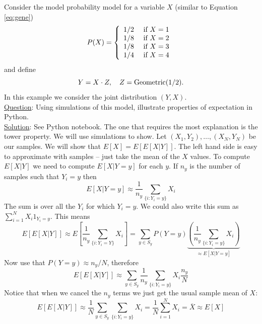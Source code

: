   
   \begin{example}
Consider the model probability model for a variable $X$ (similar to Equation \ref{eq:gene}) 
\begin{equation*}\label{eq:gene}
P(X) = \left\{ \begin{array}{cc}
1/2 & \text{ if }X=1\\
1/8 & \text{ if }X=2\\
1/8 & \text{ if }X=3\\
1/4 & \text{ if }X=4
\end{array}
 \right.\\
 \end{equation*}
 and define 
 \begin{equation*}
 Y = X\cdot Z,\quad Z = {\rm Geometric}(1/2). 
 \end{equation*}
In this example we consider the joint distribution $(Y,X)$. \\


\noindent
\underline{Question}: Using simulations of this model, illustrate properties of expectation in Python.\\

\noindent
\underline{Solution}: See Python notebook. The one that requires the most explanation is the tower property.
We will use simulations to show. Let $(X_1,Y_2),\dots,(X_N,Y_N)$ be our samples. We will show that $E[X] = E[E[X|Y]]$. The left hand side is easy to approximate with samples -- just take the mean of the $X$ values. To compute $E[X|Y]$ we need to compute $E[X|Y=y]$ for each $y$. If $n_y$ is the number of samples such that $Y_i=y$ then 
\begin{equation*}
E[X|Y=y] \approx \frac{1}{n_y}\sum_{\{i:Y_i =y\}}X_i
\end{equation*}
The sum is over all the $Y_i$ for which $Y_i=y$. We could also write this sum as $\sum_{i=1}^NX_i1_{Y_i=y}$. 
This means 
\begin{equation*}
E[E[X|Y]] \approx E\left[ \frac{1}{n_y}\sum_{\{i:Y_i =Y\}}X_i  \right] = \sum_{y \in S_y}P(Y=y)\underbrace{\left(\frac{1}{n_y}\sum_{\{i:Y_i =y\}}X_i  \right)}_{\approx E[X|Y=y]}
\end{equation*}
Now use that $P(Y=y) \approx n_y/N$, therefore 
\begin{equation*}
E[E[X|Y]]  \approx \sum_{y \in S_y}\frac{1}{n_y}\sum_{\{i:Y_i =y\}}X_i  \frac{n_y}{N}
\end{equation*}
Notice that when we cancel the $n_y$ terms we just get the usual sample mean of $X$: 
\begin{equation*}
E[E[X|Y]]  \approx \frac{1}{N} \sum_{y \in S_y}\sum_{\{i:Y_i =y\}}X_i   =  \frac{1}{N}\sum_{i=1}^NX_i = \overline{X} \approx E[X]
\end{equation*}

 \end{example}
 

